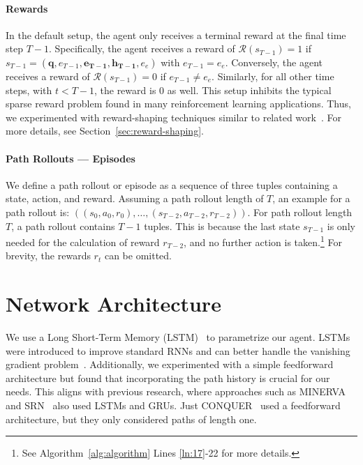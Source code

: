 \paragraph{Rewards}
In the default setup, the agent only receives a terminal reward at the final time step $T-1$. 
Specifically, the agent receives a reward of $\mathcal{R}(s_{T-1}) = 1$ if $s_{T-1} = (\mathbf{q}, e_{T-1}, \mathbf{e_{T-1}}, \mathbf{h_{T-1}}, e_e)$ with 
$e_{T-1} = e_e$. Conversely,
the agent receives a reward of $\mathcal{R}(s_{T-1}) =0$ if $e_{T-1} \neq e_e$. Similarly, for all other 
time steps, with $t < T -1$, the reward is $0$ as well. This setup inhibits the typical
sparse reward problem found in many reinforcement learning applications. Thus, we
experimented with reward-shaping techniques similar to related work~\cite{Lin2020RewardShaping,Yasunaga2021QAGNN}.
For more details, see Section~\ref{sec:reward-shaping}.

\paragraph{Path Rollouts --- Episodes}
We define a path rollout or episode as a sequence of three tuples containing 
a state, action, and reward. Assuming a path rollout length of $T$, an example
for a path rollout is: $((s_0, a_0, r_0),\dots, (s_{T-2}, a_{T-2}, r_{T-2}))$.
For path rollout length $T$, a path rollout contains $T-1$ tuples.
This is because the last state $s_{T-1}$ is only needed for the calculation of reward
$r_{T-2}$, and no further action is taken.\footnote{See Algorithm~\ref{alg:algorithm} Lines \ref{ln:17}-22 for more details.}
For brevity, the rewards $r_t$ can be omitted.




\section{Network Architecture}
\label{sec:network}
 We use a Long Short-Term Memory (LSTM)~\cite{Hochreiter1997LSTM} to parametrize our agent. LSTMs were introduced to improve 
 standard RNNs and can better handle the vanishing gradient problem~\cite{Hochreiter1997LSTM}. 
 Additionally, we experimented with a simple feedforward architecture 
 but found that incorporating the path history is crucial for our needs.
 This aligns with previous research, where approaches such as MINERVA~\cite{Das2018Minerva} and SRN~\cite{Qiu2020Stepwise} 
 also used LSTMs and GRUs. Just CONQUER~\cite{Kaiser2021Reinforcement} used a feedforward architecture, but they only 
 considered paths of length one.


